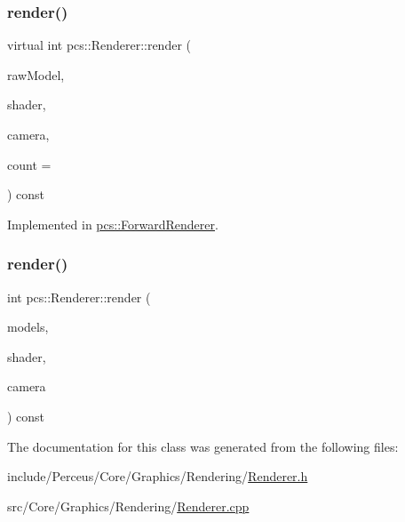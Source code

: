 \subsubsection{\texorpdfstring{render()}{render()}\hspace{0.1cm}{\footnotesize\ttfamily [1/2]}}
{\footnotesize\ttfamily virtual int pcs\+::\+Renderer\+::render (\begin{DoxyParamCaption}\item[{\hyperlink{classpcs_1_1RawModel}{Raw\+Model} $\ast$}]{raw\+Model,  }\item[{\hyperlink{classpcs_1_1ShaderProgram}{Shader\+Program} $\ast$}]{shader,  }\item[{\hyperlink{classpcs_1_1Camera}{Camera} $\ast$}]{camera,  }\item[{unsigned int}]{count = {} }\end{DoxyParamCaption}) const\hspace{0.3cm}{\ttfamily [pure virtual]}}



Implemented in \hyperlink{classpcs_1_1ForwardRenderer_a75527d1b400625fc9b33cddaff76bb33}{pcs\+::\+Forward\+Renderer}.

\mbox{\label{classpcs_1_1Renderer_a4d722540c7af2dfee44726d18aa0ce05}} 
\subsubsection{\texorpdfstring{render()}{render()}\hspace{0.1cm}{\footnotesize\ttfamily [2/2]}}
{\footnotesize\ttfamily int pcs\+::\+Renderer\+::render (\begin{DoxyParamCaption}\item[{std\+::vector$<$ \hyperlink{classpcs_1_1Model}{Model} $\ast$$>$}]{models,  }\item[{\hyperlink{classpcs_1_1ShaderProgram}{Shader\+Program} $\ast$}]{shader,  }\item[{\hyperlink{classpcs_1_1Camera}{Camera} $\ast$}]{camera }\end{DoxyParamCaption}) const}



The documentation for this class was generated from the following files\+:\begin{DoxyCompactItemize}
\item 
include/\+Perceus/\+Core/\+Graphics/\+Rendering/\hyperlink{Renderer_8h}{Renderer.\+h}\item 
src/\+Core/\+Graphics/\+Rendering/\hyperlink{Renderer_8cpp}{Renderer.\+cpp}\end{DoxyCompactItemize}
